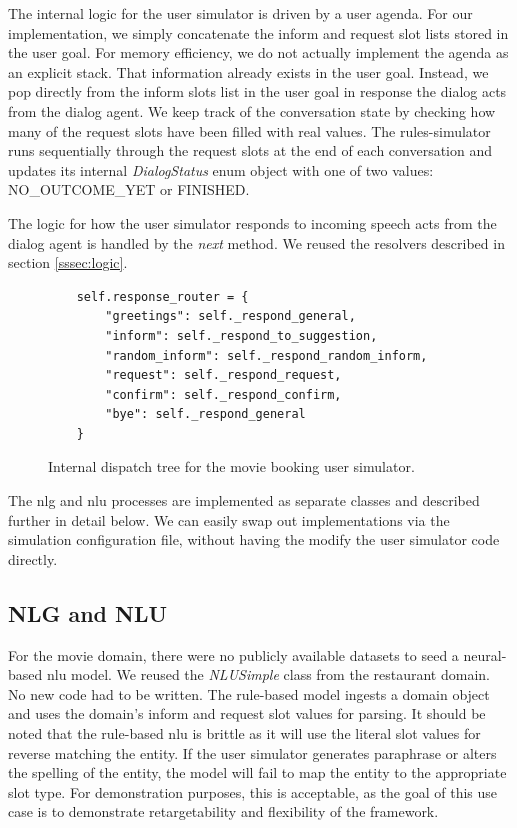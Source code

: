 The internal logic for the user simulator is driven by a user agenda. For our implementation, we simply concatenate the inform and request slot lists stored in the user goal. For memory efficiency, we do not actually implement the agenda as an explicit stack. That information already exists in the user goal. Instead, we pop directly from the inform slots list in the user goal in response the dialog acts from the dialog agent. We keep track of the conversation state by checking how many of the request slots have been filled with real values. The rules-simulator runs sequentially through the request slots at the end of each conversation and updates its internal \textit{DialogStatus} enum object with one of two values: NO\_OUTCOME\_YET or FINISHED.

The logic for how the user simulator responds to incoming speech acts from the dialog agent is handled by the \textit{next} method. We reused the resolvers described in section \ref{sssec:logic}.

\begin{figure}[h!]
	\label{fig:movie_dispatch_tree}
	\begin{lstlisting}
 	self.response_router = {
 		"greetings": self._respond_general,
		"inform": self._respond_to_suggestion,
		"random_inform": self._respond_random_inform,
		"request": self._respond_request,
		"confirm": self._respond_confirm,
		"bye": self._respond_general
	}
	\end{lstlisting}
	\caption{ Internal dispatch tree for the movie booking user simulator.}
\end{figure}

The nlg and nlu processes are implemented as separate classes and described further in detail below. We can easily swap out implementations via the simulation configuration file, without having the modify the user simulator code directly.

\subsection{NLG and NLU}

For the movie domain, there were no publicly available datasets to seed a neural-based nlu model. We reused the \textit{NLUSimple} class from the restaurant domain. No new code had to be written. The rule-based model ingests a domain object and uses the domain's inform and request slot values for parsing. It should be noted that the rule-based nlu is brittle as it will use the literal slot values for reverse matching the entity. If the user simulator generates paraphrase or alters the spelling of the entity, the model will fail to map the entity to the appropriate slot type. For demonstration purposes, this is acceptable, as the goal of this use case is to demonstrate retargetability and flexibility of the framework.

